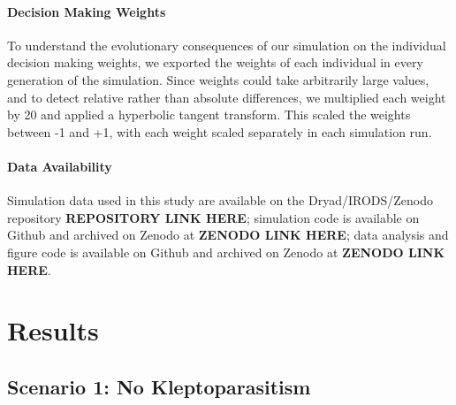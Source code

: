 \documentclass[11pt]{article}
\begin{document}
\paragraph{Decision Making Weights}

To understand the evolutionary consequences of our simulation on the individual decision making weights, we exported the weights of each individual in every generation of the simulation.
Since weights could take arbitrarily large values, and to detect relative rather than absolute differences, we multiplied each weight by 20 and applied a hyperbolic tangent transform.
This scaled the weights between -1 and +1, with each weight scaled separately in each simulation run.

\paragraph*{Data Availability}

Simulation data used in this study are available on the Dryad/IRODS/Zenodo repository \textbf{REPOSITORY LINK HERE}; 
simulation code is available on Github and archived on Zenodo at \textbf{ZENODO LINK HERE}; 
data analysis and figure code is available on Github and archived on Zenodo at \textbf{ZENODO LINK HERE}.

\section{Results}

\subsection{Scenario 1: No Kleptoparasitism}
\end{document}
